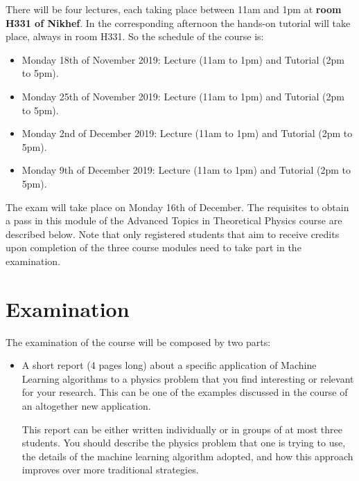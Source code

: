 \documentclass[12pt]{article}
\numberwithin{equation}{section}
\begin{document}
\begin{spacing}{1.1}
There will be four lectures, each taking place between 11am and 1pm
at {\bf room H331 of Nikhef}.
%
In the corresponding afternoon the hands-on tutorial
will take place, always in room H331. So the schedule of the course is:

\begin{itemize}

\item Monday 18th of November 2019: Lecture (11am to 1pm) and Tutorial (2pm to 5pm).

\item Monday 25th of November 2019: Lecture (11am to 1pm) and Tutorial (2pm to 5pm).

\item Monday 2nd of December 2019: Lecture (11am to 1pm) and Tutorial (2pm to 5pm).

\item Monday 9th of December 2019: Lecture (11am to 1pm) and Tutorial (2pm to 5pm).

\end{itemize}  

The exam will take place on Monday 16th of December.
%
The requisites to obtain a pass in this module of the Advanced Topics in Theoretical Physics
course are described below.
%
Note that only registered students that aim to receive credits
upon completion of the three course modules need to  take
part in the examination.

\section{Examination}

The examination of the course will be composed by two parts:

\begin{itemize}

\item A short report (4 pages long) about a specific application
  of Machine Learning algorithms
  to a physics problem that you find interesting
  or relevant for your research.
  This can be one of the examples discussed in the course
  of an altogether new application.

  
  This report can be either written individually or in groups of at most three students.
  You should describe the physics problem that one is trying to use,
  the details of the machine learning algorithm adopted, and how
  this approach improves over more traditional strategies.


\end{itemize}
\end{spacing}
\end{document}
